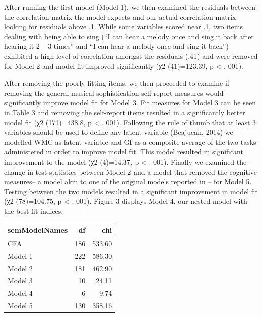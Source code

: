\documentclass[]{book}
\begin{document}
After running the first model (Model 1), we then examined the residuals between the correlation matrix the model expects and our actual correlation matrix looking for residuals
above .1.
While some variables scored near .1, two items dealing with being able to sing (``I can hear a melody once and sing it back after hearing it 2 -- 3 times'' and ``I can hear a melody once and sing it back'') exhibited a high level of correlation amongst the residuals (.41) and were removed for Model 2 and model fit improved significantly (χ2 (41)=123.39,
p \textless{} . 001).

After removing the poorly fitting items, we then proceeded to examine if removing the general musical sophistication self-report measures would significantly improve model fit for Model 3.
Fit measures for Model 3 can be seen in Table 3 and removing the self-report items resulted in a significantly better model fit (χ2 (171)=438.8, p \textless{} . 001).
Following the rule of thumb that at least 3 variables should be used to define any latent-variable (Beajuean, 2014) we modelled WMC as latent variable and Gf as a composite average of the two tasks administered in order to improve model fit.
This model resulted in significant improvement to the model (χ2 (4)=14.37, p \textless{} . 001).
Finally we examined the change in test statistics between Model 2 and a model that removed the cognitive measures-- a model akin to one of the original models reported in \citep{mullensiefenMusicalityNonMusiciansIndex2014}-- for Model 5.
Testing between the two models resulted in a significant improvement in model fit (χ2 (78)=104.75, p \textless{} . 001).
Figure 3 displays Model 4, our nested model with the best fit indices.

\begin{tabular}{l|r|r}
\hline
semModelNames & df & chi\\
\hline
CFA & 186 & 533.60\\
\hline
Model 1 & 222 & 586.30\\
\hline
Model 2 & 181 & 462.90\\
\hline
Model 3 & 10 & 24.11\\
\hline
Model 4 & 6 & 9.74\\
\hline
Model 5 & 130 & 358.16\\
\hline
\end{tabular}
\end{document}
